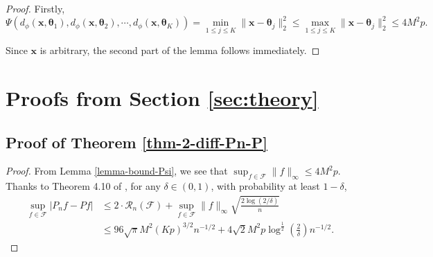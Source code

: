 \documentclass[12pt]{article}
\begin{document}
\begin{proof}
    Firstly,
    \begin{equation*}
        \Psi(d_{\phi}(\bm{x},\bm{\theta}_1), d_{\phi}(\bm{x},\bm{\theta}_2),\cdots, d_{\phi}(\bm{x},\bm{\theta}_K) ) = \min_{1\le j\le K}\|\bm{x}-\bm{\theta}_j\|_2^2 \le \max_{1\le j\le K}\|\bm{x}-\bm{\theta}_j\|_2^2 \le 4M^2p.
    \end{equation*}

    Since $\bm{x}$ is arbitrary, the second part of the lemma follows immediately.
\end{proof}

\section{Proofs from Section \ref{sec:theory}}


\subsection{Proof of Theorem \ref{thm-2-diff-Pn-P}}

\begin{proof}
    From Lemma \ref{lemma-bound-Psi}, we see that $\sup_{f\in \mathcal{F}}\|f\|_{\infty}\le 4M^2p$. Thanks to Theorem 4.10 of \cite{wainwright_2019}, for any $\delta \in (0,1)$, with probability at least $1-\delta$, 
    \begin{align*}
        \sup_{f\in \mathcal{F}}|P_n f-Pf| &\le 2\cdot\mathcal{R}_n(\mathcal{F})+\sup_{f\in \mathcal{F}}\|f\|_{\infty}\sqrt{\frac{2\log(2/\delta)}{n}}\\
        &\le 96\sqrt{\pi}M^2(Kp)^{3/2}n^{-1/2}+4\sqrt{2}M^2p\log^{\tfrac{1}{2}}\left(\frac{2}{\delta}\right) n^{-1/2}.
    \end{align*}
\end{proof}
\end{document}
